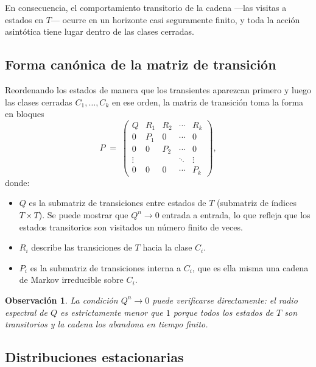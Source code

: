 \documentclass[12pt]{book}
\newtheorem{remark}{Observación}[chapter]
\begin{document}
En consecuencia, el comportamiento transitorio de la cadena —las visitas a estados en $T$— ocurre en un horizonte casi seguramente finito, y toda la acción asintótica tiene lugar dentro de las clases cerradas.

\subsection{Forma canónica de la matriz de transición}

Reordenando los estados de manera que los transientes aparezcan primero y luego las clases cerradas $C_1, \dots, C_k$ en ese orden, la matriz de transición toma la forma en bloques
\[
P \;=\;
\begin{pmatrix}
Q & R_1 & R_2 & \cdots & R_k \\
0 & P_1 & 0   & \cdots & 0   \\
0 & 0   & P_2 & \cdots & 0   \\
\vdots & & & \ddots & \vdots \\
0 & 0 & 0 & \cdots & P_k
\end{pmatrix},
\]
donde:
\begin{itemize}
    \item $Q$ es la submatriz de transiciones entre estados de $T$ (submatriz de índices $T \times T$). Se puede mostrar que $Q^n \to 0$ entrada a entrada, lo que refleja que los estados transitorios son visitados un número finito de veces.
    \item $R_i$ describe las transiciones de $T$ hacia la clase $C_i$.
    \item $P_i$ es la submatriz de transiciones interna a $C_i$, que es ella misma una cadena de Markov irreducible sobre $C_i$.
\end{itemize}

\begin{remark}
    La condición $Q^n \to 0$ puede verificarse directamente: el radio espectral de $Q$ es estrictamente menor que $1$ porque todos los estados de $T$ son transitorios y la cadena los abandona en tiempo finito.
\end{remark}

\subsection{Distribuciones estacionarias}
\end{document}
